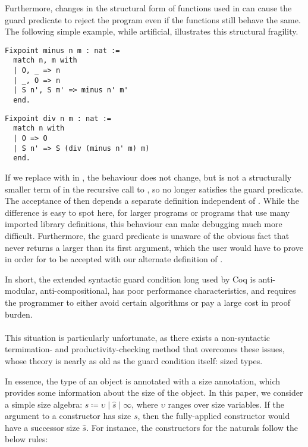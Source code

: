Furthermore, changes in the structural form of functions used in \cofixpoints can cause the guard predicate to reject the program even if the functions still behave the same.
The following simple example, while artificial, illustrates this structural fragility.
\begin{verbatim}
Fixpoint minus n m : nat :=
  match n, m with
  | O, _ => n
  | _, O => n
  | S n', S m' => minus n' m'
  end.
\end{verbatim}
\begin{verbatim}
Fixpoint div n m : nat :=
  match n with
  | O => O
  | S n' => S (div (minus n' m) m)
  end.
\end{verbatim}

If we replace  with  in , the behaviour does not change, but  is not a structurally smaller term of  in the recursive call to , so  no longer satisfies the guard predicate.
The acceptance of  then depends a separate definition independent of .
While the difference is easy to spot here, for larger programs or programs that use many imported library definitions,
this behaviour can make debugging much more difficult.
Furthermore, the guard predicate is unaware of the obvious fact that  never returns a  larger than its first argument, which the user would have to prove in order for  to be accepted with our alternate definition of .

In short, the extended syntactic guard condition long used by Coq is anti-modular, anti-compositional, has poor performance characteristics, and requires the programmer to either avoid certain algorithms or pay a large cost in proof burden.

\paragraph*{} This situation is particularly unfortunate, as there exists a non-syntactic termimation- and productivity-checking method that overcomes these issues,
whose theory is nearly as old as the guard condition itself: sized types.

In essence, the \coinductive type of an object is annotated with a size annotation, which provides some information about the size of the object.
In this paper, we consider a simple size algebra: \mbox{$s \coloneqq \upsilon \mid \hat{s} \mid \infty$}, where $\upsilon$ ranges over size variables.
If the argument to a constructor has size $s$, then the fully-applied constructor would have a successor size $\hat{s}$.
For instance, the constructors for the naturals follow the below rules:

